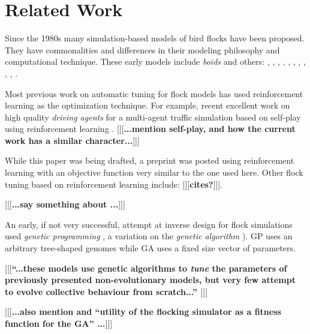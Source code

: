 \documentclass[letterpaper]{article}
\begin{document}
\section{Related Work}
\label{sec:related}

Since the 1980s many simulation-based models of bird flocks have been proposed. They have commonalities and differences in their modeling philosophy and computational technique. These early models include \textit{boids} and others:
\citet{aoki_simulation_1982}, 
\citet{akira_okubo_dynamical_1986}, 
\citep{reynolds_flocks_1987},
\citet{toner_flocks_1998}, 
\citet{frank_heppner_stochastic_1990}, 
\citet{bajec_simulating_2005},
\citet{cucker_emergent_2007},
\citet{moskon_fuzzy_2007},
\citet{cavagna_seventh_2008},
\citet{bajec_organized_2009},
\citet{hoetzlein_flock2_2024}.

Most previous work on automatic tuning for flock models has used reinforcement learning \citep{sutton_reinforcement_1998} as the optimization technique. For example, recent excellent work on high quality \textit{driving agents} for a multi-agent traffic simulation based on self-play using reinforcement learning \citep{cornelisse_building_2025}.
[[[\textbf{...mention self-play, and how the current work has a similar character...}]]]

While this paper was being drafted, a preprint was posted \citep{brambati_learning_2025} using reinforcement learning with an objective function very similar to the one used here. Other flock tuning based on reinforcement learning include:
[[[\textbf{cites?}]]].

[[[\textbf{...say something about \citep{jaderberg_human-level_2019}...}]]]

An early, if not very successful, attempt at inverse design for flock simulations \citep{reynolds_evolved_1993} used \textit{genetic programming} \citep{koza_genetic_1992}, a variation on the \textit{genetic algorithm} \citep{holland_adaptation_1975}). GP uses an arbitrary tree-shaped genomes while GA uses a fixed size vector of parameters.

[[[\textbf{``...these models use genetic algorithms to \textit{tune} the parameters of previously presented non-evolutionary models, but very few attempt to evolve collective behaviour from scratch...'' \citep{demsar_evolution_2017}}]]]

[[[\textbf{...also mention \citep{stonedahl_finding_2011} and ``utility of the flocking simulator as a fitness function for the GA'' ...}]]]
\end{document}
